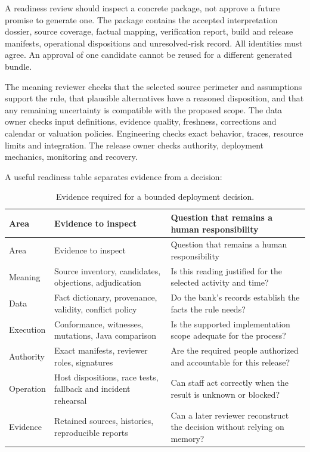 \documentclass[12pt,a4paper,oneside,openany]{book}
\begin{document}
A readiness review should inspect a concrete package, not approve a future promise
to generate one. The package contains the accepted interpretation dossier, source
coverage, factual mapping, verification report, build and release manifests,
operational dispositions and unresolved-risk record. All identities must agree.
An approval of one candidate cannot be reused for a different generated bundle.

The meaning reviewer checks that the selected source perimeter and assumptions
support the rule, that plausible alternatives have a reasoned disposition, and
that any remaining uncertainty is compatible with the proposed scope. The data
owner checks input definitions, evidence quality, freshness, corrections and
calendar or valuation policies. Engineering checks exact behavior, traces,
resource limits and integration. The release owner checks authority, deployment
mechanics, monitoring and recovery.

A useful readiness table separates evidence from a decision:
\begin{longtable}{@{}P{31mm}P{60mm}P{57mm}@{}}
\caption{Evidence required for a bounded deployment decision.}\\
\toprule
Area & Evidence to inspect & Question that remains a human responsibility\\\midrule\endfirsthead
\toprule Area & Evidence to inspect & Question that remains a human responsibility\\\midrule\endhead
Meaning & Source inventory, candidates, objections, adjudication & Is this reading justified for the selected activity and time?\\
Data & Fact dictionary, provenance, validity, conflict policy & Do the bank's records establish the facts the rule needs?\\
Execution & Conformance, witnesses, mutations, Java comparison & Is the supported implementation scope adequate for the process?\\
Authority & Exact manifests, reviewer roles, signatures & Are the required people authorized and accountable for this release?\\
Operation & Host dispositions, race tests, fallback and incident rehearsal & Can staff act correctly when the result is unknown or blocked?\\
Evidence & Retained sources, histories, reproducible reports & Can a later reviewer reconstruct the decision without relying on memory?\\
\bottomrule
\end{longtable}
\end{document}

